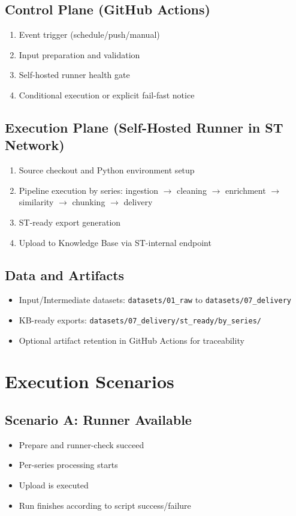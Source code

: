 \documentclass[11pt,a4paper]{article}
\begin{document}
\subsection{Control Plane (GitHub Actions)}
\begin{enumerate}
  \item Event trigger (schedule/push/manual)
  \item Input preparation and validation
  \item Self-hosted runner health gate
  \item Conditional execution or explicit fail-fast notice
\end{enumerate}

\subsection{Execution Plane (Self-Hosted Runner in ST Network)}
\begin{enumerate}
  \item Source checkout and Python environment setup
  \item Pipeline execution by series:
  ingestion $\rightarrow$ cleaning $\rightarrow$ enrichment $\rightarrow$ similarity $\rightarrow$ chunking $\rightarrow$ delivery
  \item ST-ready export generation
  \item Upload to Knowledge Base via ST-internal endpoint
\end{enumerate}

\subsection{Data and Artifacts}
\begin{itemize}
  \item Input/Intermediate datasets: \texttt{datasets/01\_raw} to \texttt{datasets/07\_delivery}
  \item KB-ready exports: \texttt{datasets/07\_delivery/st\_ready/by\_series/}
  \item Optional artifact retention in GitHub Actions for traceability
\end{itemize}

\section{Execution Scenarios}
\subsection{Scenario A: Runner Available}
\begin{itemize}
  \item Prepare and runner-check succeed
  \item Per-series processing starts
  \item Upload is executed
  \item Run finishes according to script success/failure
\end{itemize}
\end{document}
